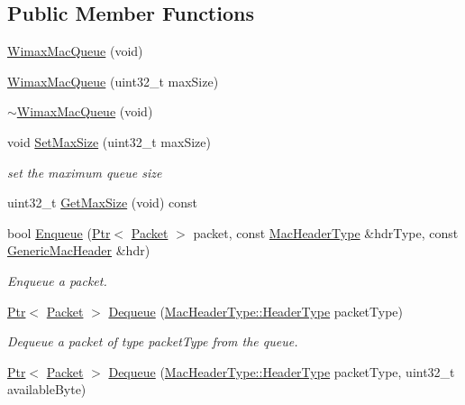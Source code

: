 \subsection*{Public Member Functions}
\begin{DoxyCompactItemize}
\item 
\hyperlink{classns3_1_1WimaxMacQueue_a2978c30111d68fc5040b9b2ce0eda457}{Wimax\+Mac\+Queue} (void)
\item 
\hyperlink{classns3_1_1WimaxMacQueue_a6ebd98be79482411ee1459c95092dd80}{Wimax\+Mac\+Queue} (uint32\+\_\+t max\+Size)
\item 
\hyperlink{classns3_1_1WimaxMacQueue_a69c675dc2eada68324b59757e94d893d}{$\sim$\+Wimax\+Mac\+Queue} (void)
\item 
void \hyperlink{classns3_1_1WimaxMacQueue_a36209a94c1f33be73c2445545a1892b0}{Set\+Max\+Size} (uint32\+\_\+t max\+Size)
\begin{DoxyCompactList}\small\item\em set the maximum queue size \end{DoxyCompactList}\item 
uint32\+\_\+t \hyperlink{classns3_1_1WimaxMacQueue_a72eb630919d5c06c596546ea5924380a}{Get\+Max\+Size} (void) const 
\item 
bool \hyperlink{classns3_1_1WimaxMacQueue_acf25b96a645045ebb802d721e52e6f49}{Enqueue} (\hyperlink{classns3_1_1Ptr}{Ptr}$<$ \hyperlink{classns3_1_1Packet}{Packet} $>$ packet, const \hyperlink{classns3_1_1MacHeaderType}{Mac\+Header\+Type} \&hdr\+Type, const \hyperlink{classns3_1_1GenericMacHeader}{Generic\+Mac\+Header} \&hdr)
\begin{DoxyCompactList}\small\item\em Enqueue a packet. \end{DoxyCompactList}\item 
\hyperlink{classns3_1_1Ptr}{Ptr}$<$ \hyperlink{classns3_1_1Packet}{Packet} $>$ \hyperlink{classns3_1_1WimaxMacQueue_a4043c5bb643fbac159a09d19a6e4bb7b}{Dequeue} (\hyperlink{classns3_1_1MacHeaderType_a54d8fc8bc93a2b7865627965cdd31c20}{Mac\+Header\+Type\+::\+Header\+Type} packet\+Type)
\begin{DoxyCompactList}\small\item\em Dequeue a packet of type packet\+Type from the queue. \end{DoxyCompactList}\item 
\hyperlink{classns3_1_1Ptr}{Ptr}$<$ \hyperlink{classns3_1_1Packet}{Packet} $>$ \hyperlink{classns3_1_1WimaxMacQueue_aac94a92a71629a7d916571e4847bc035}{Dequeue} (\hyperlink{classns3_1_1MacHeaderType_a54d8fc8bc93a2b7865627965cdd31c20}{Mac\+Header\+Type\+::\+Header\+Type} packet\+Type, uint32\+\_\+t available\+Byte)

\end{DoxyCompactItemize}
